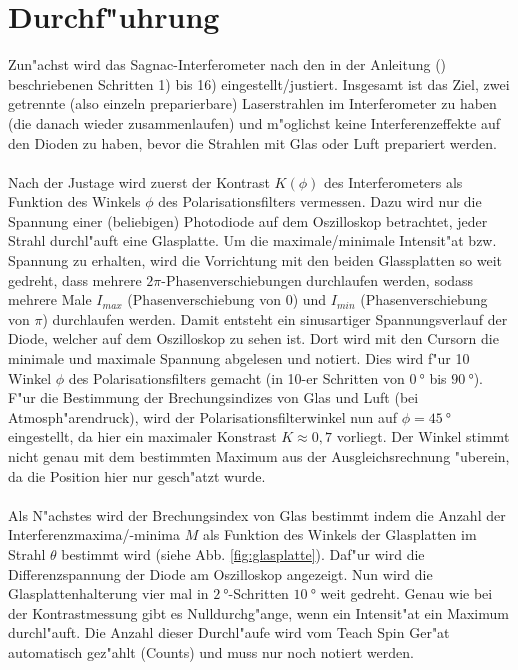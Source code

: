 \section{Durchf"uhrung}
  Zun"achst wird das Sagnac-Interferometer nach den in der Anleitung (\cite{Anleitung}) beschriebenen Schritten 1) bis 16) eingestellt/justiert.
  Insgesamt ist das Ziel, zwei getrennte (also einzeln preparierbare) Laserstrahlen im Interferometer zu haben (die danach wieder zusammenlaufen) und m"oglichst keine Interferenzeffekte auf den Dioden zu haben, bevor die Strahlen mit Glas oder Luft prepariert werden.\\
  \\Nach der Justage wird zuerst der Kontrast $K(\phi)$ des Interferometers als Funktion des Winkels $\phi$ des Polarisationsfilters vermessen.
  Dazu wird nur die Spannung einer (beliebigen) Photodiode auf dem Oszilloskop betrachtet, jeder Strahl durchl"auft eine Glasplatte.
  Um die maximale/minimale Intensit"at bzw. Spannung zu erhalten, wird die Vorrichtung mit den beiden Glassplatten so weit gedreht, dass mehrere $2 \pi$-Phasenverschiebungen durchlaufen werden, sodass mehrere Male $I_{max}$ (Phasenverschiebung von 0) und $I_{min}$ (Phasenverschiebung von $\pi$) durchlaufen werden.
  Damit entsteht ein sinusartiger Spannungsverlauf der Diode, welcher auf dem Oszilloskop zu sehen ist. Dort wird mit den Cursorn die minimale und maximale Spannung abgelesen und notiert.
  Dies wird f"ur 10 Winkel $\phi$ des Polarisationsfilters gemacht (in 10-er Schritten von $\SI{0}{\degree}$ bis $\SI{90}{\degree}$).
  F"ur die Bestimmung der Brechungsindizes von Glas und Luft (bei Atmosph"arendruck), wird der Polarisationsfilterwinkel nun auf $\phi=\SI{45}{\degree}$ eingestellt, da hier ein maximaler Konstrast $K \approx 0,7$ vorliegt.
  Der Winkel stimmt nicht genau mit dem bestimmten Maximum aus der Ausgleichsrechnung "uberein, da die Position hier nur gesch"atzt wurde.\\
  \\Als N"achstes wird der Brechungsindex von Glas bestimmt indem die Anzahl der Interferenzmaxima/-minima $M$ als Funktion des Winkels der Glasplatten im Strahl $\theta$ bestimmt wird (siehe Abb. \ref{fig:glasplatte}).
  Daf"ur wird die Differenzspannung der Diode am Oszilloskop angezeigt.
  Nun wird die Glasplattenhalterung vier mal in $\SI{2}{\degree}$-Schritten $\SI{10}{\degree}$ weit gedreht.
  Genau wie bei der Kontrastmessung gibt es Nulldurchg"ange, wenn ein Intensit"at ein Maximum durchl"auft.
  Die Anzahl dieser Durchl"aufe wird vom Teach Spin Ger"at automatisch gez"ahlt (Counts) und muss nur noch notiert werden.\\
